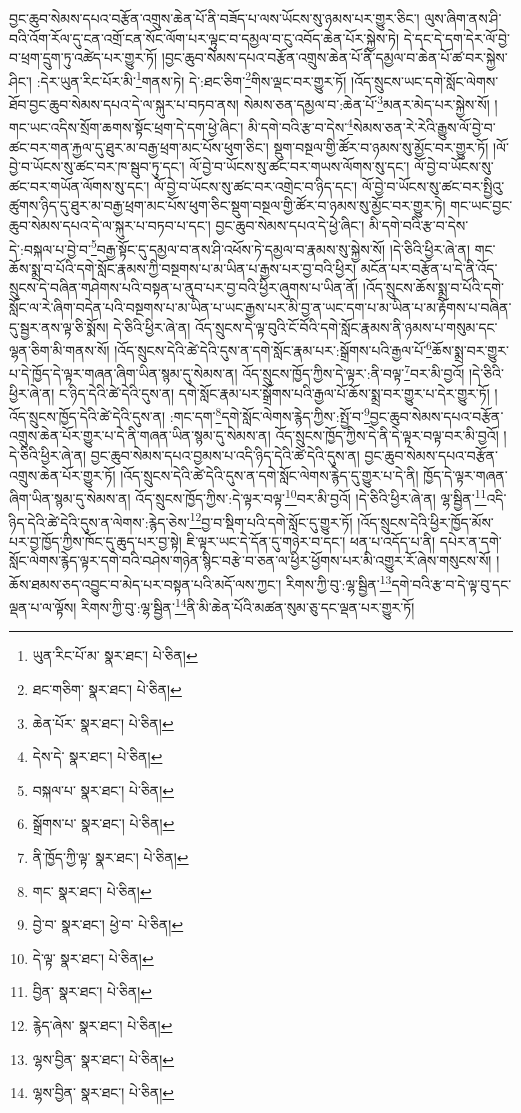 བྱང་ཆུབ་སེམས་དཔའ་བརྩོན་འགྲུས་ཆེན་པོ་ནི་བཟོད་པ་ལས་ཡོངས་སུ་ཉམས་པར་གྱུར་ཅིང་། ལུས་ཞིག་ནས་ཤི་བའི་འོག་རོལ་དུ་ངན་འགྲོ་ངན་སོང་ལོག་པར་ལྟུང་བ་དམྱལ་བ་ངུ་འབོད་ཆེན་པོར་སྐྱེས་ཏེ། དེ་དང་དེ་དག་དེར་ལོ་བྱེ་བ་ཕྲག་དྲུག་ཏུ་འཚེད་པར་གྱུར་ཏོ། །བྱང་ཆུབ་སེམས་དཔའ་བརྩོན་འགྲུས་ཆེན་པོ་ནི་དམྱལ་བ་ཆེན་པོ་ཚ་བར་སྐྱེས་ཤིང་། :དེར་ཡུན་རིང་པོར་མི་\footnote{ཡུན་རིང་པོ་མ་  སྣར་ཐང་།  པེ་ཅིན། }གནས་ཏེ། དེ་:ཐང་ཅིག་\footnote{ཐང་གཅིག་  སྣར་ཐང་།  པེ་ཅིན། }གིས་ལྡང་བར་གྱུར་ཏོ། །འོད་སྲུངས་ཡང་དགེ་སློང་ལེགས་ཐོབ་བྱང་ཆུབ་སེམས་དཔའ་དེ་ལ་སྐུར་པ་བཏབ་ནས། སེམས་ཅན་དམྱལ་བ་:ཆེན་པོ་\footnote{ཆེན་པོར་  སྣར་ཐང་།  པེ་ཅིན། }མནར་མེད་པར་སྐྱེས་སོ། །གང་ཡང་འདིས་སྲོག་ཆགས་སྟོང་ཕྲག་དེ་དག་ཕྱེ་ཞིང་། མི་དགེ་བའི་རྩ་བ་དེས་\footnote{དེས་དེ་  སྣར་ཐང་།  པེ་ཅིན། }སེམས་ཅན་རེ་རེའི་རྒྱུས་ལོ་བྱེ་བ་ཚང་བར་གན་རྐྱལ་དུ་ཐུར་མ་བརྒྱ་ཕྲག་མང་པོས་ཕུག་ཅིང་། སྡུག་བསྔལ་གྱི་ཚོར་བ་ཉམས་སུ་མྱོང་བར་གྱུར་ཏོ། །ལོ་བྱེ་བ་ཡོངས་སུ་ཚང་བར་ཁ་སྦུབ་ཏུ་དང་། ལོ་བྱེ་བ་ཡོངས་སུ་ཚང་བར་གཡས་ལོགས་སུ་དང་། ལོ་བྱེ་བ་ཡོངས་སུ་ཚང་བར་གཡོན་ལོགས་སུ་དང་། ལོ་བྱེ་བ་ཡོངས་སུ་ཚང་བར་འགྲེང་བ་ཉིད་དང་། ལོ་བྱེ་བ་ཡོངས་སུ་ཚང་བར་སྤྱིའུ་ཚུགས་ཉིད་དུ་ཐུར་མ་བརྒྱ་ཕྲག་མང་པོས་ཕུག་ཅིང་སྡུག་བསྔལ་གྱི་ཚོར་བ་ཉམས་སུ་མྱོང་བར་གྱུར་ཏེ། གང་ཡང་བྱང་ཆུབ་སེམས་དཔའ་དེ་ལ་སྐུར་པ་བཏབ་པ་དང་། བྱང་ཆུབ་སེམས་དཔའ་དེ་ཕྱེ་ཞིང་། མི་དགེ་བའི་རྩ་བ་དེས་དེ་:བསྐལ་པ་བྱེ་བ་\footnote{བསྐལ་པ་  སྣར་ཐང་།  པེ་ཅིན། }བརྒྱ་སྟོང་དུ་དམྱལ་བ་ནས་ཤི་འཕོས་ཏེ་དམྱལ་བ་རྣམས་སུ་སྐྱེས་སོ། །དེ་ཅིའི་ཕྱིར་ཞེ་ན། གང་ཆོས་སྨྲ་བ་པོའི་དགེ་སློང་རྣམས་ཀྱི་བསྔགས་པ་མ་ཡིན་པ་རྒྱས་པར་བྱ་བའི་ཕྱིར། མངོན་པར་བརྩོན་པ་དེ་ནི་འོད་སྲུངས་དེ་བཞིན་གཤེགས་པའི་བསྟན་པ་ནུབ་པར་བྱ་བའི་ཕྱིར་ཞུགས་པ་ཡིན་ནོ། །འོད་སྲུངས་ཆོས་སྨྲ་བ་པོའི་དགེ་སློང་ལ་རེ་ཞིག་བདེན་པའི་བསྔགས་པ་མ་ཡིན་པ་ཡང་རྒྱས་པར་མི་བྱ་ན་ཡང་དག་པ་མ་ཡིན་པ་མ་རྟོགས་པ་བཞིན་དུ་སྦྱར་ནས་ལྟ་ཅི་སྨོས། དེ་ཅིའི་ཕྱིར་ཞེ་ན། འོད་སྲུངས་དེ་ལྟ་བུའི་ངོ་བོའི་དགེ་སློང་རྣམས་ནི་ཉམས་པ་གསུམ་དང་ལྷན་ཅིག་མི་གནས་སོ། །འོད་སྲུངས་དེའི་ཚེ་དེའི་དུས་ན་དགེ་སློང་རྣམ་པར་:སྒྲོགས་པའི་རྒྱལ་པོ་\footnote{སྒྲོགས་པ་  སྣར་ཐང་།  པེ་ཅིན། }ཆོས་སྨྲ་བར་གྱུར་པ་དེ་ཁྱོད་དེ་ལྟར་གཞན་ཞིག་ཡིན་སྙམ་དུ་སེམས་ན། འོད་སྲུངས་ཁྱོད་ཀྱིས་དེ་ལྟར་:ནི་བལྟ་\footnote{ནི་ཁྱོད་ཀྱི་ལྟ་  སྣར་ཐང་།  པེ་ཅིན། }བར་མི་བྱའོ། །དེ་ཅིའི་ཕྱིར་ཞེ་ན། ང་ཉིད་དེའི་ཚེ་དེའི་དུས་ན། དགེ་སློང་རྣམ་པར་སྒྲོགས་པའི་རྒྱལ་པོ་ཆོས་སྨྲ་བར་གྱུར་པ་དེར་གྱུར་ཏོ། །འོད་སྲུངས་ཁྱོད་དེའི་ཚེ་དེའི་དུས་ན། :གང་དག་\footnote{གང་  སྣར་ཐང་།  པེ་ཅིན། }དགེ་སློང་ལེགས་རྙེད་ཀྱིས་:སྤྱོ་བ་\footnote{བྱེ་བ་  སྣར་ཐང་། ཕྱེ་བ་  པེ་ཅིན། }བྱང་ཆུབ་སེམས་དཔའ་བརྩོན་འགྲུས་ཆེན་པོར་གྱུར་པ་དེ་ནི་གཞན་ཡིན་སྙམ་དུ་སེམས་ན། འོད་སྲུངས་ཁྱོད་ཀྱིས་དེ་ནི་དེ་ལྟར་བལྟ་བར་མི་བྱའོ། །དེ་ཅིའི་ཕྱིར་ཞེ་ན། བྱང་ཆུབ་སེམས་དཔའ་བྱམས་པ་འདི་ཉིད་དེའི་ཚེ་དེའི་དུས་ན། བྱང་ཆུབ་སེམས་དཔའ་བརྩོན་འགྲུས་ཆེན་པོར་གྱུར་ཏོ། །འོད་སྲུངས་དེའི་ཚེ་དེའི་དུས་ན་དགེ་སློང་ལེགས་རྙེད་དུ་གྱུར་པ་དེ་ནི། ཁྱོད་དེ་ལྟར་གཞན་ཞིག་ཡིན་སྙམ་དུ་སེམས་ན། འོད་སྲུངས་ཁྱོད་ཀྱིས་:དེ་ལྟར་བལྟ་\footnote{དེ་ལྟ་  སྣར་ཐང་།  པེ་ཅིན། }བར་མི་བྱའོ། །དེ་ཅིའི་ཕྱིར་ཞེ་ན། ལྷ་སྦྱིན་\footnote{བྱིན་  སྣར་ཐང་།  པེ་ཅིན། }འདི་ཉིད་དེའི་ཚེ་དེའི་དུས་ན་ལེགས་:རྙེད་ཅེས་\footnote{རྙེད་ཞེས་  སྣར་ཐང་།  པེ་ཅིན། }བྱ་བ་སྡིག་པའི་དགེ་སློང་དུ་གྱུར་ཏོ། །འོད་སྲུངས་དེའི་ཕྱིར་ཁྱོད་མོས་པར་བྱ་ཁྱོད་ཀྱིས་ཁོང་དུ་ཆུད་པར་བྱ་སྟེ། ཇི་ལྟར་ཡང་དེ་དོན་དུ་གཉེར་བ་དང་། ཕན་པ་འདོད་པ་ནི། དཔེར་ན་དགེ་སློང་ལེགས་རྙེད་ལྟར་དགེ་བའི་བཤེས་གཉེན་སྙིང་བརྩེ་བ་ཅན་ལ་ཕྱིར་ཕྱོགས་པར་མི་འགྱུར་རོ་ཞེས་གསུངས་སོ། །ཆོས་ཐམས་ཅད་འབྱུང་བ་མེད་པར་བསྟན་པའི་མདོ་ལས་ཀྱང་། རིགས་ཀྱི་བུ་:ལྷ་སྦྱིན་\footnote{ལྷས་བྱིན་  སྣར་ཐང་།  པེ་ཅིན། }དགེ་བའི་རྩ་བ་དེ་ལྟ་བུ་དང་ལྡན་པ་ལ་ལྟོས། རིགས་ཀྱི་བུ་:ལྷ་སྦྱིན་\footnote{ལྷས་བྱིན་  སྣར་ཐང་།  པེ་ཅིན། }ནི་མི་ཆེན་པོའི་མཚན་སུམ་ཅུ་དང་ལྡན་པར་གྱུར་ཏོ། 